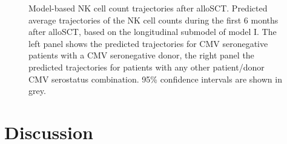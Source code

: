 \documentclass[
  letterpaper,
  paper=240mm:170mm,
  twoside=true,
  open=right,
  fontsize=10pt,
  pagesize=false,
  BCOR=15mm,
  DIV=14,
  headinclude=true,
  footinclude=false,
  headsepline=on]{scrbook}
\begin{document}
\begin{figure}


\caption{\label{fig-DLI-seven}Model-based NK cell count trajectories
after alloSCT. Predicted average trajectories of the NK cell counts
during the first 6 months after alloSCT, based on the longitudinal
submodel of model I. The left panel shows the predicted trajectories for
CMV seronegative patients with a CMV seronegative donor, the right panel
the predicted trajectories for patients with any other patient/donor CMV
serostatus combination. 95\% confidence intervals are shown in grey.}

\end{figure}%

\section{Discussion}\label{discussion-1}
\end{document}
